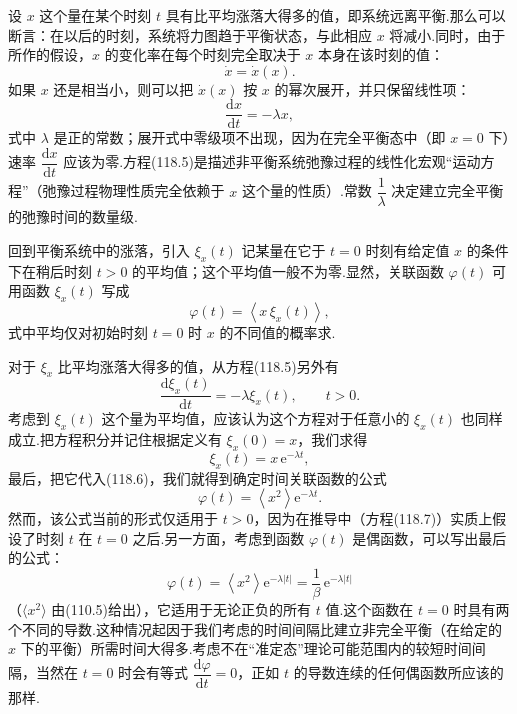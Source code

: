 设 $x$ 这个量在某个时刻 $t$ 具有比平均涨落大得多的值，即系统远离平衡.那么可以断言：在以后的时刻，系统将力图趋于平衡状态，与此相应 $x$ 将减小.同时，由于所作的假设，$x$ 的变化率在每个时刻完全取决于 $x$ 本身在该时刻的值：
\begin{equation*}
  \dot{x}=\dot{x}(x).
\end{equation*}
如果 $x$ 还是相当小，则可以把 $\dot{x}(x)$ 按 $x$ 的幂次展开，并只保留线性项：
\begin{equation}
  \frac{\mathrm{d}x}{\mathrm{d}t}=-\lambda x,
\end{equation}
式中 $\lambda$ 是正的常数；展开式中零级项不出现，因为在完全平衡态中（即 $x=0$ 下）速率
$\dfrac{\mathrm{d}x}{\mathrm{d}t}$ 应该为零.方程(118.5)是描述非平衡系统弛豫过程的线性化宏观“运动方程”（弛豫过程物理性质完全依赖于 $x$ 这个量的性质）.常数
$\dfrac{1}{\lambda}$ 决定建立完全平衡的弛豫时间的数量级.

回到平衡系统中的涨落，引入 $\xi_{x}(t)$ 记某量在它于 $t=0$ 时刻有给定值 $x$
的条件下在稍后时刻 $t>0$ 的平均值；这个平均值一般不为零.显然，关联函数 $\varphi(t)$
可用函数 $\xi_{x}(t)$ 写成
\begin{equation}
  \varphi(t)=\left\langle x\,\xi_{x}(t)\right\rangle,
\end{equation}
式中平均仅对初始时刻 $t=0$ 时 $x$ 的不同值的概率求.

对于 $\xi_{x}$ 比平均涨落大得多的值，从方程(118.5)另外有
\begin{equation}
  \frac{\mathrm{d}\xi_{x}(t)}{\mathrm{d}t}=-\lambda\xi_{x}(t),
  \qquad t>0.
\end{equation}
考虑到 $\xi_{x}(t)$ 这个量为平均值，应该认为这个方程对于任意小的 $\xi_{x}(t)$
也同样成立.把方程积分并记住根据定义有 $\xi_{x}(0)=x$，我们求得
\begin{equation*}
  \xi_{x}(t)=x\,\mathrm{e}^{-\lambda t},
\end{equation*}
最后，把它代入(118.6)，我们就得到确定时间关联函数的公式
\begin{equation*}
  \varphi(t)=\left\langle x^{2}\right\rangle\mathrm{e}^{-\lambda t}.
\end{equation*}
然而，该公式当前的形式仅适用于 $t>0$，因为在推导中（方程(118.7)）实质上假设了时刻 $t$ 在
$t=0$ 之后.另一方面，考虑到函数 $\varphi(t)$ 是偶函数，可以写出最后的公式：
\begin{equation}
  \varphi(t)=\left\langle x^{2}\right\rangle\mathrm{e}^{-\lambda|t|}
  =\frac{1}{\beta}\,\mathrm{e}^{-\lambda|t|}
\end{equation}
（$\langle x^{2}\rangle$ 由(110.5)给出），它适用于无论正负的所有 $t$
值.这个函数在 $t=0$ 时具有两个不同的导数.这种情况起因于我们考虑的时间间隔比建立非完全平衡（在给定的 $x$ 下的平衡）所需时间大得多.考虑不在“准定态”理论可能范围内的较短时间间隔，当然在 $t=0$ 时会有等式
$\dfrac{\mathrm{d}\varphi}{\mathrm{d}t}=0$，正如 $t$ 的导数连续的任何偶函数所应该的那样.

